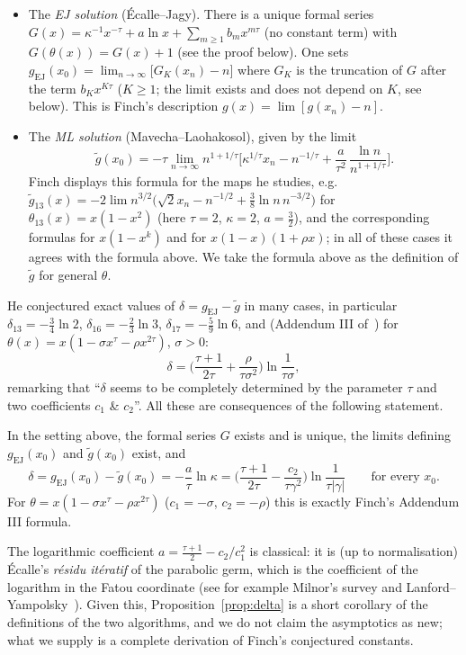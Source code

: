 \begin{itemize}[leftmargin=2em]
\item The \emph{EJ solution} (\'Ecalle--Jagy). There is a unique formal series $G(x)=\kappa^{-1}x^{-\tau}+a\ln x+\sum_{m\ge1}b_mx^{m\tau}$ (no constant term) with $G(\theta(x))=G(x)+1$ (see the proof below). One sets $g_{\mathrm{EJ}}(x_0)=\lim_{n\to\infty}\big[G_K(x_n)-n\big]$ where $G_K$ is the truncation of $G$ after the term $b_Kx^{K\tau}$ ($K\ge1$; the limit exists and does not depend on $K$, see below). This is Finch's description $g(x)=\lim[g(x_n)-n]$.
\item The \emph{ML solution} (Mavecha--Laohakosol), given by the limit
\[
\tilde g(x_0)=-\tau\lim_{n\to\infty}n^{1+1/\tau}\Big[\kappa^{1/\tau}x_n-n^{-1/\tau}+\frac a{\tau^2}\,\frac{\ln n}{n^{1+1/\tau}}\Big].
\]
Finch displays this formula for the maps he studies, e.g.\ $\tilde g_{13}(x)=-2\lim n^{3/2}\big(\sqrt2x_n-n^{-1/2}+\tfrac38\ln n\,n^{-3/2}\big)$ for $\theta_{13}(x)=x(1-x^2)$ (here $\tau=2$, $\kappa=2$, $a=\tfrac32$), and the corresponding formulas for $x(1-x^k)$ and for $x(1-x)(1+\rho x)$; in all of these cases it agrees with the formula above. We take the formula above as the definition of $\tilde g$ for general $\theta$.
\end{itemize}
He conjectured exact values of $\delta=g_{\mathrm{EJ}}-\tilde g$ in many cases, in particular $\delta_{13}=-\tfrac34\ln2$, $\delta_{16}=-\tfrac23\ln3$, $\delta_{17}=-\tfrac59\ln6$, and (Addendum III of~\cite{FinchDelta}) for $\theta(x)=x(1-\sigma x^\tau-\rho x^{2\tau})$, $\sigma>0$:
\[
\delta=\Big(\frac{\tau+1}{2\tau}+\frac{\rho}{\tau\sigma^2}\Big)\ln\frac1{\tau\sigma},
\]
remarking that ``$\delta$ seems to be completely determined by the parameter $\tau$ and two coefficients $c_1$ \& $c_2$''. All these are consequences of the following statement.

\begin{proposition}\label{prop:delta}
In the setting above, the formal series $G$ exists and is unique, the limits defining $g_{\mathrm{EJ}}(x_0)$ and $\tilde g(x_0)$ exist, and
\[
\delta=g_{\mathrm{EJ}}(x_0)-\tilde g(x_0)=-\frac a\tau\ln\kappa=\Big(\frac{\tau+1}{2\tau}-\frac{c_2}{\tau\gamma^2}\Big)\ln\frac1{\tau|\gamma|}\qquad\text{for every }x_0.
\]
For $\theta=x(1-\sigma x^\tau-\rho x^{2\tau})$ ($c_1=-\sigma$, $c_2=-\rho$) this is exactly Finch's Addendum III formula.
\end{proposition}

\begin{remark}
The logarithmic coefficient $a=\tfrac{\tau+1}2-c_2/c_1^2$ is classical: it is (up to normalisation) \'Ecalle's \emph{r\'esidu it\'eratif} of the parabolic germ, which is the coefficient of the logarithm in the Fatou coordinate (see for example Milnor's survey and Lanford--Yampolsky~\cite{LY}). Given this, Proposition~\ref{prop:delta} is a short corollary of the definitions of the two algorithms, and we do not claim the asymptotics as new; what we supply is a complete derivation of Finch's conjectured constants.
\end{remark}

